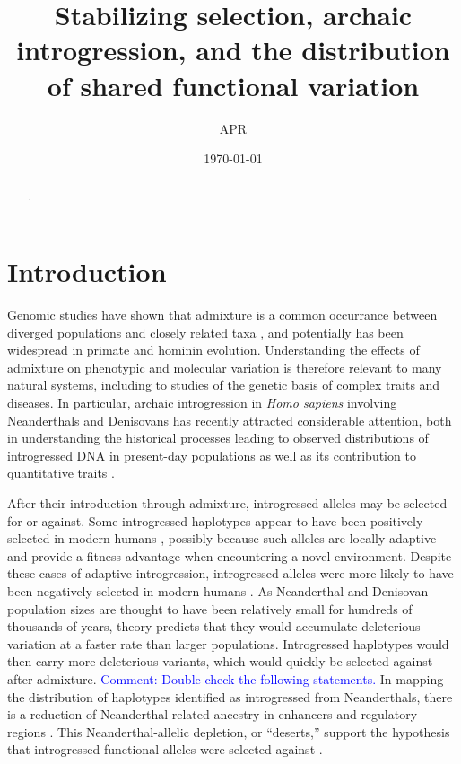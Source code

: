 \documentclass{article}
\title{Stabilizing selection, archaic introgression, and the distribution
of shared functional variation}
\author{APR}
\date{\today}
\newcommand{\aprcomment}[1]{{\textcolor{blue}{Comment: #1}}}
\begin{document}
\maketitle    

\begin{abstract}
    .
\end{abstract}

\section*{Introduction}

Genomic studies have shown that admixture is a common occurrance between
diverged populations and closely related taxa \citep{brandvain2014speciation,
skoglund2015ancient,suvorov2022widespread}, and potentially has been widespread
in primate \citep{tung2017contribution,sorensen2023genome} and hominin
\citep{wolf2018outstanding,peter2020100} evolution. Understanding the effects
of admixture on phenotypic and molecular variation is therefore relevant to
many natural systems, including to studies of the genetic basis of complex
traits and diseases. In particular, archaic introgression in \emph{Homo
sapiens} involving Neanderthals and Denisovans has recently attracted
considerable attention, both in understanding the historical processes leading
to observed distributions of introgressed DNA in present-day populations
\citep{prufer2014complete,villanea2019multiple,chen2020identifying} as well as
its contribution to quantitative traits
\citep{sankararaman2016combined,wei2023lingering}.

After their introduction through admixture, introgressed alleles may be
selected for or against. Some introgressed haplotypes appear to have been
positively selected in modern humans
\citep{huerta2014altitude,racimo2017signatures,enard2018evidence,gower2021detecting},
possibly because such alleles are locally adaptive and provide a fitness
advantage when encountering a novel environment. Despite these cases of
adaptive introgression, introgressed alleles were more likely to have been
negatively selected in modern humans
\citep{harris2016genetic,juric2016strength}. As Neanderthal and Denisovan
population sizes are thought to have been relatively small for hundreds of
thousands of years, theory predicts that they would accumulate deleterious
variation at a faster rate than larger populations. Introgressed haplotypes
would then carry more deleterious variants, which would quickly be selected
against after admixture. \aprcomment{Double check the following statements.} In
mapping the distribution of haplotypes identified as introgressed from
Neanderthals, there is a reduction of Neanderthal-related ancestry in enhancers
and regulatory regions
\citep{petr2019limits,telis2020selection,yermakovich2023long}. This
Neanderthal-allelic depletion, or ``deserts,'' support the hypothesis that
introgressed functional alleles were selected against
\citep{sankararaman2014genomic,sankararaman2016combined}.
\end{document}
